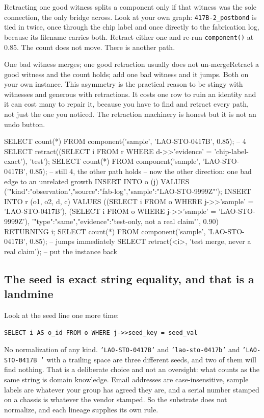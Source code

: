 Retracting one good witness splits a component only if that witness was the sole connection, the only bridge across. Look at your own graph: \texttt{417B-2\_postbond} is tied in twice, once through the chip label and once directly to the fabrication log, because its filename carries both. Retract either one and re-run \texttt{component()} at 0.85. The count does not move. There is another path.

\begin{Correspondence}{One bad witness merges; one good retraction usually does not un-merge}{Retract a good witness and the count holds; add one bad witness and it jumps. Both on your own instance.}
This asymmetry is the practical reason to be stingy with witnesses and generous with retractions. It costs one row to ruin an identity and it can cost many to repair it, because you have to find and retract every path, not just the one you noticed. The retraction machinery is honest but it is not an undo button.
\begin{Check}
SELECT count(*) FROM component('sample', 'LAO-STO-0417B', 0.85);   -- 4
SELECT retract((SELECT i FROM r WHERE d->>'evidence' = 'chip-label-exact'), 'test');
SELECT count(*) FROM component('sample', 'LAO-STO-0417B', 0.85);   -- still 4, the other path holds
-- now the other direction: one bad edge to an unrelated growth
INSERT INTO o (j) VALUES
  ('{"kind":"observation","source":"fab-log","sample":"LAO-STO-9999Z"}');
INSERT INTO r (o1, o2, d, c) VALUES
  ((SELECT i FROM o WHERE j->>'sample' = 'LAO-STO-0417B'),
   (SELECT i FROM o WHERE j->>'sample' = 'LAO-STO-9999Z'),
   '{"type":"same","evidence":"test-only, not a real claim"}', 0.90)
RETURNING i;
SELECT count(*) FROM component('sample', 'LAO-STO-0417B', 0.85);   -- jumps immediately
SELECT retract(<i>, 'test merge, never a real claim');             -- put the instance back
\end{Check}
\end{Correspondence}

\subsection{The seed is exact string equality, and that is a landmine}

Look at the seed line one more time:

\begin{lstlisting}
SELECT i AS o_id FROM o WHERE j->>seed_key = seed_val
\end{lstlisting}

No normalization of any kind. \texttt{'LAO-STO-0417B'} and \texttt{'lao-sto-0417b'} and \texttt{'LAO-STO-0417B '} with a trailing space are three different seeds, and two of them will find nothing. That is a deliberate choice and not an oversight: what counts as the same string is domain knowledge. Email addresses are case-insensitive, sample labels are whatever your group has agreed they are, and a serial number stamped on a chassis is whatever the vendor stamped. So the substrate does not normalize, and each lineage supplies its own rule.

